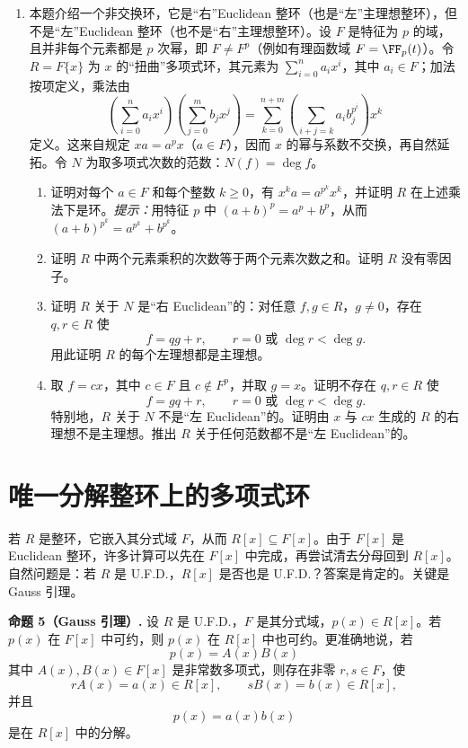 \begin{enumerate}[label=\arabic*.]
	\item 本题介绍一个非交换环，它是“右”Euclidean 整环（也是“左”主理想整环），但不是“左”Euclidean 整环（也不是“右”主理想整环）。设 $F$ 是特征为 $p$ 的域，且并非每个元素都是 $p$ 次幂，即 $F\neq F^p$（例如有理函数域 $F=\FF_p(t)$）。令 $R=F\{x\}$ 为 $x$ 的“扭曲”多项式环，其元素为 $\sum_{i=0}^n a_i x^i$，其中 $a_i\in F$；加法按项定义，乘法由
	\[
	\left(\sum_{i=0}^n a_i x^i\right)
	\left(\sum_{j=0}^m b_j x^j\right)
	=
	\sum_{k=0}^{n+m}\left(\sum_{i+j=k} a_i b_j^{p^i}\right)x^k
	\]
	定义。这来自规定 $xa=a^p x$（$a\in F$），因而 $x$ 的幂与系数不交换，再自然延拓。令 $N$ 为取多项式次数的范数：$N(f)=\deg f$。
	\begin{enumerate}[label=(\alph*)]
		\item 证明对每个 $a\in F$ 和每个整数 $k\geq0$，有 $x^k a=a^{p^k}x^k$，并证明 $R$ 在上述乘法下是环。\emph{提示：}用特征 $p$ 中 $(a+b)^p=a^p+b^p$，从而 $(a+b)^{p^k}=a^{p^k}+b^{p^k}$。
		\item 证明 $R$ 中两个元素乘积的次数等于两个元素次数之和。证明 $R$ 没有零因子。
		\item 证明 $R$ 关于 $N$ 是“右 Euclidean”的：对任意 $f,g\in R$，$g\neq0$，存在 $q,r\in R$ 使
		\[
		f=qg+r,
		\qquad r=0\text{ 或 }\deg r<\deg g.
		\]
		用此证明 $R$ 的每个左理想都是主理想。
		\item 取 $f=cx$，其中 $c\in F$ 且 $c\notin F^p$，并取 $g=x$。证明不存在 $q,r\in R$ 使
		\[
		f=gq+r,
		\qquad r=0\text{ 或 }\deg r<\deg g.
		\]
		特别地，$R$ 关于 $N$ 不是“左 Euclidean”的。证明由 $x$ 与 $cx$ 生成的 $R$ 的右理想不是主理想。推出 $R$ 关于任何范数都不是“左 Euclidean”的。
	\end{enumerate}
\end{enumerate}

\section{唯一分解整环上的多项式环}

若 $R$ 是整环，它嵌入其分式域 $F$，从而 $R[x]\subseteq F[x]$。由于 $F[x]$ 是 Euclidean 整环，许多计算可以先在 $F[x]$ 中完成，再尝试清去分母回到 $R[x]$。自然问题是：若 $R$ 是 U.F.D.，$R[x]$ 是否也是 U.F.D.？答案是肯定的。关键是 Gauss 引理。

\noindent\textbf{命题 5（Gauss 引理）.} 设 $R$ 是 U.F.D.，$F$ 是其分式域，$p(x)\in R[x]$。若 $p(x)$ 在 $F[x]$ 中可约，则 $p(x)$ 在 $R[x]$ 中也可约。更准确地说，若
\[
p(x)=A(x)B(x)
\]
其中 $A(x),B(x)\in F[x]$ 是非常数多项式，则存在非零 $r,s\in F$，使
\[
rA(x)=a(x)\in R[x],\qquad sB(x)=b(x)\in R[x],
\]
并且
\[
p(x)=a(x)b(x)
\]
是在 $R[x]$ 中的分解。


